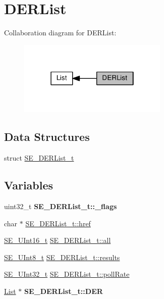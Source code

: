 \hypertarget{group__DERList}{}\section{D\+E\+R\+List}
\label{group__DERList}
Collaboration diagram for D\+E\+R\+List\+:\nopagebreak
\begin{figure}[H]
\begin{center}
\leavevmode
\includegraphics[width=202pt]{group__DERList}
\end{center}
\end{figure}
\subsection*{Data Structures}
\begin{DoxyCompactItemize}
\item 
struct \hyperlink{structSE__DERList__t}{S\+E\+\_\+\+D\+E\+R\+List\+\_\+t}
\end{DoxyCompactItemize}
\subsection*{Variables}
\begin{DoxyCompactItemize}
\item 
\mbox{\label{group__DERList_ga15e89f7f3fa99d192745c5e410464456}} 
uint32\+\_\+t {\bfseries S\+E\+\_\+\+D\+E\+R\+List\+\_\+t\+::\+\_\+flags}
\item 
char $\ast$ \hyperlink{group__DERList_gacfb770fdc796c21720ac7a361245ca9e}{S\+E\+\_\+\+D\+E\+R\+List\+\_\+t\+::href}
\item 
\hyperlink{group__UInt16_gac68d541f189538bfd30cfaa712d20d29}{S\+E\+\_\+\+U\+Int16\+\_\+t} \hyperlink{group__DERList_ga9aaa7fb12c771329499444b27f994150}{S\+E\+\_\+\+D\+E\+R\+List\+\_\+t\+::all}
\item 
\hyperlink{group__UInt8_gaf7c365a1acfe204e3a67c16ed44572f5}{S\+E\+\_\+\+U\+Int8\+\_\+t} \hyperlink{group__DERList_ga54493ab9c3e5dd91709ef6fa49fdc70a}{S\+E\+\_\+\+D\+E\+R\+List\+\_\+t\+::results}
\item 
\hyperlink{group__UInt32_ga70bd4ecda3c0c85d20779d685a270cdb}{S\+E\+\_\+\+U\+Int32\+\_\+t} \hyperlink{group__DERList_ga2b2db250d29172061ea81a3f2d88d190}{S\+E\+\_\+\+D\+E\+R\+List\+\_\+t\+::poll\+Rate}
\item 
\mbox{\label{group__DERList_gab089304e5241e8245db646c351450562}} 
\hyperlink{structList}{List} $\ast$ {\bfseries S\+E\+\_\+\+D\+E\+R\+List\+\_\+t\+::\+D\+ER}
\end{DoxyCompactItemize}


